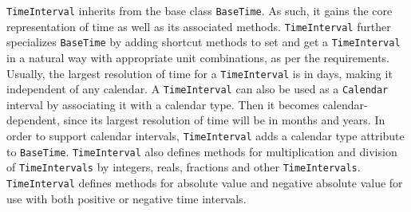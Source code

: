 
{\tt TimeInterval} inherits from the base class {\tt BaseTime}.  As such,
it gains the core representation of time as well as its associated methods.
{\tt TimeInterval} further specializes {\tt BaseTime} by adding shortcut
methods to set and get a {\tt TimeInterval} in a natural way with
appropriate unit combinations, as per the requirements.  Usually, the
largest resolution of time for a {\tt TimeInterval} is in days, making it
independent of any calendar.  A {\tt TimeInterval} can also be used as a
{\tt Calendar} interval by associating it with a calendar type.  Then it
becomes calendar-dependent, since its largest resolution of time will be
in months and years.  In order to support calendar intervals,
{\tt TimeInterval} adds a calendar type attribute to {\tt BaseTime}.
{\tt TimeInterval} also defines methods for multiplication and division
of {\tt TimeIntervals} by integers, reals, fractions and other
{\tt TimeIntervals}.  {\tt TimeInterval} defines methods for absolute
value and negative absolute value for use with both positive or
negative time intervals.